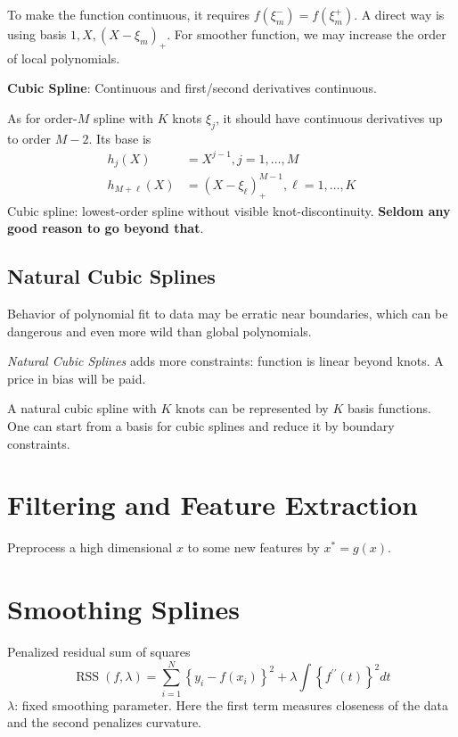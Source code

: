 To make the function continuous, it requires $f(\xi_m^-)=f(\xi_m^+)$. A direct way is using
basis $1,X,(X-\xi_m)_+$. For smoother function, we may increase the order of local polynomials. 

\noindent\textbf{Cubic Spline}: Continuous and first/second derivatives continuous. 

As for order-$M$ spline with $K$ knots $\xi_j$, it should have continuous derivatives up to
order $M-2$. Its base is 
\begin{align*}
h_{j}(X) &=X^{j-1}, j=1, \ldots, M \\ 
h_{M+\ell}(X) &=\left(X-\xi_{\ell}\right)_{+}^{M-1}, \ell=1, \ldots, K
\end{align*}
Cubic spline: lowest-order spline without visible knot-discontinuity. \textbf{Seldom any good 
reason to go beyond that}. 

\subsection{Natural Cubic Splines}
Behavior of polynomial fit to data may be erratic near boundaries, which can be dangerous and
even more wild than global polynomials.  

\textit{Natural Cubic Splines} adds more constraints: function is linear beyond knots. A price
in bias will be paid. 

A natural cubic spline with $K$ knots can be represented by $K$ basis functions. One can start
from a basis for cubic splines and reduce it by boundary constraints. 

\section{Filtering and Feature Extraction}
Preprocess a high dimensional $x$ to some new features by $x^*=g(x)$. 

\section{Smoothing Splines}
Penalized residual sum of squares
\begin{equation}\label{PRSS}
    \operatorname{RSS}(f, \lambda)=\sum_{i=1}^{N}\left\{y_{i}-f\left(x_{i}\right)\right\}^{2}
    +\lambda \int\left\{f^{\prime \prime}(t)\right\}^{2} d t
\end{equation}
$\lambda$: fixed smoothing parameter. Here the first term measures closeness of the data
and the second penalizes curvature. 

